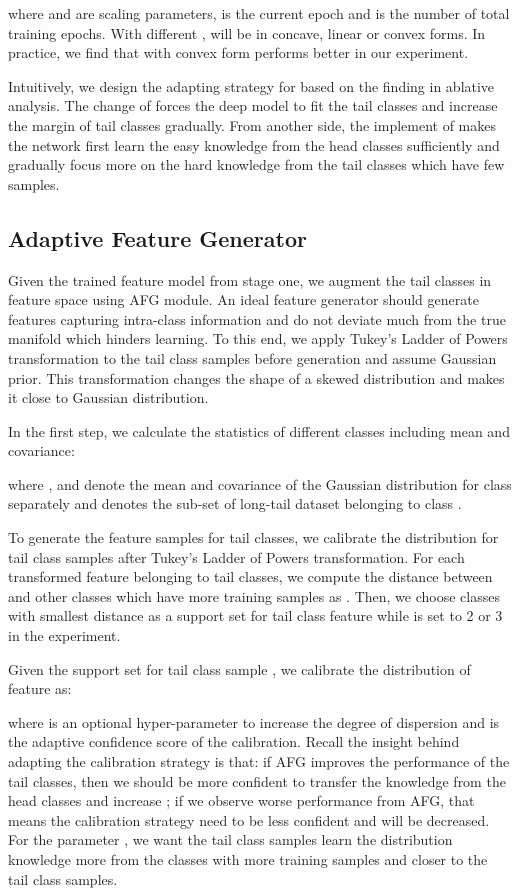 \documentclass[runningheads]{llncs}
\begin{document}
where  and   are scaling parameters,  is the current epoch and  is the number of total training epochs. With different ,  will be in concave, linear or convex forms. In practice, we find that  with convex form  performs better in our experiment. 

Intuitively, we design the adapting strategy for  based on the finding in ablative analysis. The change of  forces the deep model to fit the tail classes and increase the margin of tail classes gradually. From another side, the implement of  makes the network first learn the easy knowledge from the head classes sufficiently and gradually focus more on the hard knowledge from the tail classes which have few samples. 

\subsection{Adaptive Feature Generator}
Given the trained feature model from stage one, we augment the tail classes in feature space using AFG module. An ideal feature generator should generate features capturing intra-class information and do not deviate much from the true manifold which hinders learning. To this end, we apply Tukey's Ladder of Powers transformation \cite{tukey1977exploratory} to the tail class samples before generation and assume Gaussian prior. This transformation changes the shape of a skewed distribution and makes it close to Gaussian distribution.

In the first step, we calculate the statistics of different classes including mean and covariance:


 where ,  and  denote the mean and covariance of the Gaussian distribution for class  separately and  denotes the sub-set of long-tail dataset  belonging to class .
 
To generate the feature samples for tail classes, we calibrate the distribution for tail class samples after Tukey's Ladder of Powers transformation. For each transformed feature  belonging to tail classes, we compute the distance between  and other classes  which have more training samples as . Then, we choose  classes with smallest distance as a support set  for tail class feature  while  is set to 2 or 3 in the experiment.



Given the support set  for tail class sample , we calibrate the distribution of feature  as:


where  is an optional hyper-parameter to increase the degree of dispersion and  is the adaptive confidence score of the calibration. Recall the insight behind adapting the calibration strategy is that: if AFG improves the performance of the tail classes, then we should be more confident to transfer the knowledge from the head classes and increase ; if we observe worse performance from AFG, that means the calibration strategy need to be less confident and  will be decreased. For the parameter , we want the tail class samples learn the distribution knowledge more from the classes with more training samples and closer to the tail class samples.
\end{document}

